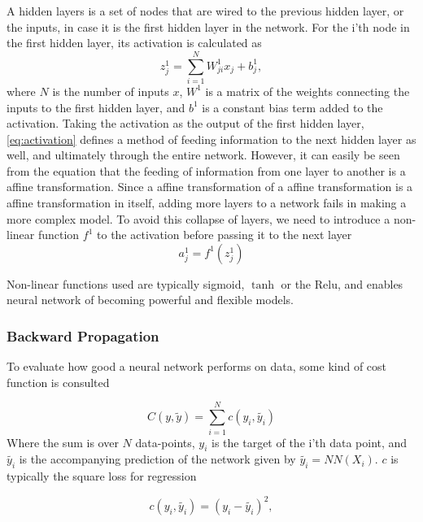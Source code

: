 A hidden layers is a set of nodes that are wired to the previous hidden layer, or the inputs, in case it is the first hidden layer in the 
network. For the i'th node in the first hidden layer, its activation is 
calculated as
\begin{equation}\label{eq:activation}
    z^1_j = \sum_{i=1}^N W^1_{ji}x_j + b^1_j,
\end{equation}
where $N$ is the number of inputs $x$, $W^1$ is a matrix of the weights connecting the inputs to the first hidden layer, and $b^1$ is a constant bias term added to the activation. Taking the activation as the output of the first hidden layer, \autoref{eq:activation} defines a method of feeding information to the next hidden layer as well, and ultimately through the entire network. However, it can easily be seen from the equation that the feeding of information from one layer to another is a affine transformation. Since a affine transformation of a affine transformation is a affine transformation in itself, adding more layers to a network fails in making a more complex model. To avoid this collapse of 
layers, we need to introduce a non-linear function $f^1$ to the activation before 
passing it to the next layer
\begin{equation}\label{eq:non_linear}
    a^1_j = f^1(z^1_j)
\end{equation}

Non-linear functions used are typically sigmoid, $\tanh$ or the Relu, and enables neural network of becoming powerful and flexible models.

\subsubsection{Backward Propagation}
To evaluate how good a neural network performs on data, some kind of 
cost function is consulted

\begin{equation}\label{eq:cost}
    C(y, \tilde{y}) = \sum_{i=1}^N c(y_i, \tilde{y_i}) 
\end{equation}
Where the sum is over $N$ data-points, $y_i$ is the target of the i'th data point,
and $\tilde{y_i}$ is the accompanying prediction of the network given by $\tilde{y_i} = NN(X_i)$. $c$ is typically the square loss for regression

\begin{equation}\label{eq:square_loss}
    c(y_i, \tilde{y_i}) = (y_i - \tilde{y_i})^2,
\end{equation}

